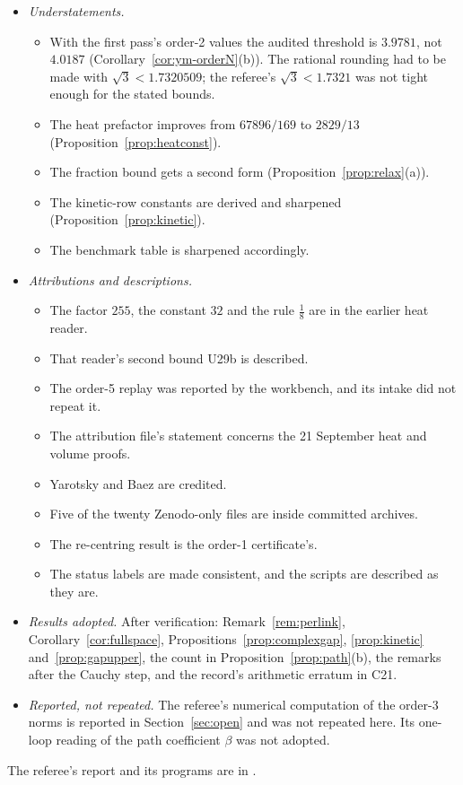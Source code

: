 \begin{itemize}
\item \emph{Understatements.}
\begin{itemize}
\item With the first pass's order-2 values the audited threshold is $3.9781$, not $4.0187$ (Corollary~\ref{cor:ym-orderN}(b)). The rational rounding had to be made with $\sqrt3<1.7320509$; the referee's $\sqrt3<1.7321$ was not tight enough for the stated bounds.
\item The heat prefactor improves from $67896/169$ to $2829/13$ (Proposition~\ref{prop:heatconst}).
\item The fraction bound gets a second form (Proposition~\ref{prop:relax}(a)).
\item The kinetic-row constants are derived and sharpened (Proposition~\ref{prop:kinetic}).
\item The benchmark table is sharpened accordingly.
\end{itemize}
\item \emph{Attributions and descriptions.}
\begin{itemize}
\item The factor $255$, the constant $32$ and the rule $\frac18$ are in the earlier heat reader.
\item That reader's second bound U29b is described.
\item The order-5 replay was reported by the workbench, and its intake did not repeat it.
\item The attribution file's statement concerns the 21 September heat and volume proofs.
\item Yarotsky and Baez are credited.
\item Five of the twenty Zenodo-only files are inside committed archives.
\item The re-centring result is the order-1 certificate's.
\item The status labels are made consistent, and the scripts are described as they are.
\end{itemize}
\item \emph{Results adopted.} After verification: Remark~\ref{rem:perlink}, Corollary~\ref{cor:fullspace}, Propositions~\ref{prop:complexgap}, \ref{prop:kinetic} and~\ref{prop:gapupper}, the count in Proposition~\ref{prop:path}(b), the remarks after the Cauchy step, and the record's arithmetic erratum in C21.
\item \emph{Reported, not repeated.} The referee's numerical computation of the order-3 norms is reported in Section~\ref{sec:open} and was not repeated here. Its one-loop reading of the path coefficient $\beta$ was not adopted.
\end{itemize}
The referee's report and its programs are in .

